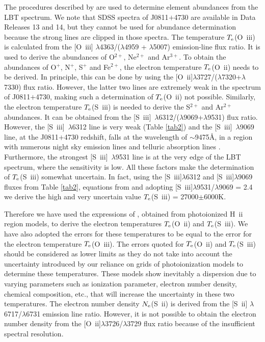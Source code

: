 \documentclass[useAMS,usenatbib]{mn2e}
\begin{document}
The procedures described by \citet{I06} are used to determine element 
abundances from the LBT spectrum. We note that SDSS spectra of
J0811$+$4730 are available in Data Releases 13 and 14, but they cannot be used for  
abundance determination because the strong lines are clipped in those spectra. 
The temperature $T_{\rm e}$(O~{\sc iii}) is calculated from the 
[O~{\sc iii}] $\lambda$4363/($\lambda$4959 + $\lambda$5007) emission-line flux 
ratio. It is used to derive the abundances of O$^{2+}$, Ne$^{2+}$ and Ar$^{3+}$.
To obtain the abundances of O$^{+}$, N$^{+}$, S$^{+}$ and Fe$^{2+}$, the electron
temperature $T_{\rm e}$(O~{\sc ii}) needs to be derived. In principle, this can
be done by using the [O~{\sc ii}]$\lambda$3727/($\lambda$7320+$\lambda$7330) flux
ratio. However, the latter two lines are extremely weak in the spectrum 
of J0811$+$4730,
making such a determination of $T_{\rm e}$(O~{\sc ii}) not possible. Similarly,
the electron temperature $T_{\rm e}$(S~{\sc iii}) is needed to derive the 
S$^{2+}$ and Ar$^{2+}$ abundances. It can be obtained from the 
[S~{\sc iii}]~$\lambda$6312/($\lambda$9069+$\lambda$9531) flux ratio. However,
the [S~{\sc iii}]~$\lambda$6312 line is very weak (Table \ref{tab2}) and
the [S~{\sc iii}]~$\lambda$9069 line, at the J0811$+$4730 redshift, falls at the wavelength of $\sim$9475\AA, in a region with numerous night sky emission lines
\citep[e.g., fig. 9 in ][]{L11} and telluric absorption lines
\citep[e.g., fig. 1 in ][]{R16}. Furthermore, the strongest 
[S~{\sc iii}]~$\lambda$9531 line is at the very edge of the LBT spectrum, where
the sensitivity is low. 
All these factors make the determination of 
$T_{\rm e}$(S~{\sc iii}) somewhat uncertain. In fact, using the 
[S~{\sc iii}]$\lambda$6312 and [S~{\sc iii}]$\lambda$9069 fluxes from 
Table \ref{tab2}, equations from \citet{A84} and adopting 
[S~{\sc iii}]$\lambda$9531/$\lambda$9069 = 2.4 we derive the high and very 
uncertain value $T_{\rm e}$(S~{\sc iii}) = 27000$\pm$6000K.

Therefore we have used the expressions of \citet{I06}, obtained from 
photoionized H~{\sc ii} region models, to derive the electron 
temperatures $T_{\rm e}$(O~{\sc ii}) and $T_{\rm e}$(S~{\sc iii}). We have also
adopted the errors for these temperatures to be equal to the error for
the electron temperature $T_{\rm e}$(O~{\sc iii}).
The errors quoted  for $T_{\rm e}$(O~{\sc ii}) and $T_{\rm e}$(S~{\sc iii}) should 
be considered as lower limits as they do not take into account the uncertainty 
introduced by our reliance on 
grids of photoionization models to determine these temperatures. These models 
show inevitably a 
dispersion due to varying parameters such as ionization parameter, electron 
number density, chemical composition, etc., that will increase the uncertainty 
in these two temperatures. 
 The electron number density $N_{\rm e}$(S~{\sc ii}) is derived from the 
[S~{\sc ii}] $\lambda$6717/$\lambda$6731 emission line ratio. 
However, it is not possible to obtain the electron number density
from the [O~{\sc ii}]$\lambda$3726/$\lambda$3729 flux ratio because of the
insufficient spectral resolution. 
\end{document}
